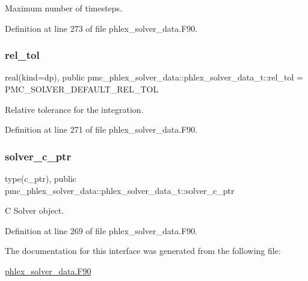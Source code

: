 Maximum number of timesteps. 



Definition at line 273 of file phlex\+\_\+solver\+\_\+data.\+F90.

\mbox{\label{structpmc__phlex__solver__data_1_1phlex__solver__data__t_a3bf99107bb62750ef6575e0046111030}} 
\subsubsection{\texorpdfstring{rel\+\_\+tol}{rel\_tol}}
{\footnotesize\ttfamily real(kind=dp), public pmc\+\_\+phlex\+\_\+solver\+\_\+data\+::phlex\+\_\+solver\+\_\+data\+\_\+t\+::rel\+\_\+tol = P\+M\+C\+\_\+\+S\+O\+L\+V\+E\+R\+\_\+\+D\+E\+F\+A\+U\+L\+T\+\_\+\+R\+E\+L\+\_\+\+T\+OL}



Relative tolerance for the integration. 



Definition at line 271 of file phlex\+\_\+solver\+\_\+data.\+F90.

\mbox{\label{structpmc__phlex__solver__data_1_1phlex__solver__data__t_af354fd0908e66c37d49ca12139abe5be}} 
\subsubsection{\texorpdfstring{solver\+\_\+c\+\_\+ptr}{solver\_c\_ptr}}
{\footnotesize\ttfamily type(c\+\_\+ptr), public pmc\+\_\+phlex\+\_\+solver\+\_\+data\+::phlex\+\_\+solver\+\_\+data\+\_\+t\+::solver\+\_\+c\+\_\+ptr}



C Solver object. 



Definition at line 269 of file phlex\+\_\+solver\+\_\+data.\+F90.



The documentation for this interface was generated from the following file\+:\begin{DoxyCompactItemize}
\item 
\mbox{\hyperlink{phlex__solver__data_8_f90}{phlex\+\_\+solver\+\_\+data.\+F90}}\end{DoxyCompactItemize}
